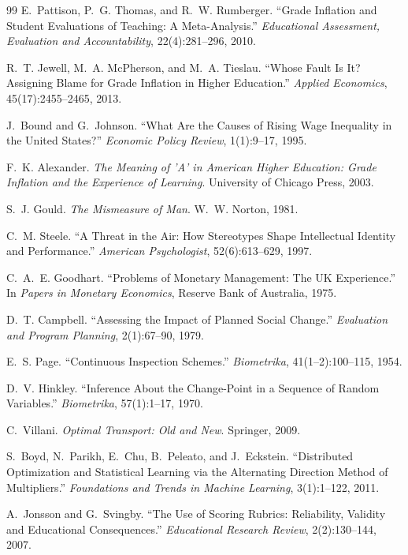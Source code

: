 \documentclass[12pt,a4paper]{article}
\theoremstyle{remark}
\begin{document}
\begin{thebibliography}{99}
E.~Pattison, P.~G. Thomas, and R.~W. Rumberger. ``Grade Inflation and Student Evaluations of Teaching: A Meta-Analysis.'' \emph{Educational Assessment, Evaluation and Accountability}, 22(4):281--296, 2010.

R.~T. Jewell, M.~A. McPherson, and M.~A. Tieslau. ``Whose Fault Is It? Assigning Blame for Grade Inflation in Higher Education.'' \emph{Applied Economics}, 45(17):2455--2465, 2013.

J.~Bound and G.~Johnson. ``What Are the Causes of Rising Wage Inequality in the United States?'' \emph{Economic Policy Review}, 1(1):9--17, 1995.

F.~K. Alexander. \emph{The Meaning of 'A' in American Higher Education: Grade Inflation and the Experience of Learning}. University of Chicago Press, 2003.

S.~J. Gould. \emph{The Mismeasure of Man}. W.~W. Norton, 1981.

C.~M. Steele. ``A Threat in the Air: How Stereotypes Shape Intellectual Identity and Performance.'' \emph{American Psychologist}, 52(6):613--629, 1997.

C.~A.~E. Goodhart. ``Problems of Monetary Management: The UK Experience.'' In \emph{Papers in Monetary Economics}, Reserve Bank of Australia, 1975.

D.~T. Campbell. ``Assessing the Impact of Planned Social Change.'' \emph{Evaluation and Program Planning}, 2(1):67--90, 1979.

E.~S. Page. ``Continuous Inspection Schemes.'' \emph{Biometrika}, 41(1--2):100--115, 1954.

D.~V. Hinkley. ``Inference About the Change-Point in a Sequence of Random Variables.'' \emph{Biometrika}, 57(1):1--17, 1970.

C.~Villani. \emph{Optimal Transport: Old and New}. Springer, 2009.

S.~Boyd, N.~Parikh, E.~Chu, B.~Peleato, and J.~Eckstein. ``Distributed Optimization and Statistical Learning via the Alternating Direction Method of Multipliers.'' \emph{Foundations and Trends in Machine Learning}, 3(1):1--122, 2011.

A.~Jonsson and G.~Svingby. ``The Use of Scoring Rubrics: Reliability, Validity and Educational Consequences.'' \emph{Educational Research Review}, 2(2):130--144, 2007.


\end{thebibliography}
\end{document}
